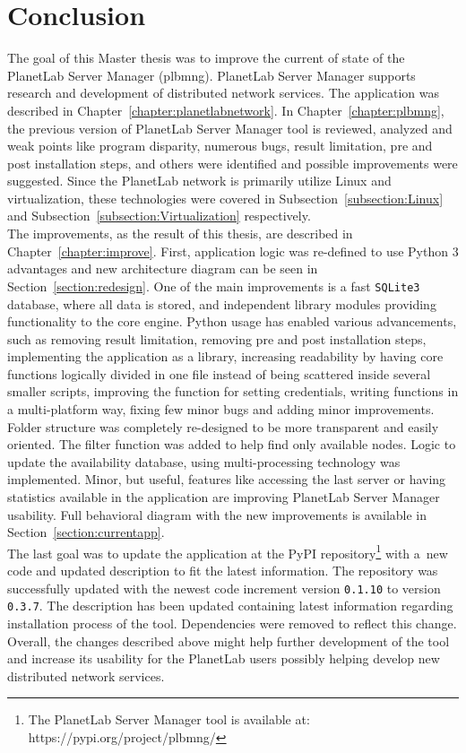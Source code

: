 \chapter{Conclusion}
The goal of this Master thesis was to improve the current of state of the PlanetLab Server Manager (plbmng). PlanetLab Server Manager supports research and development of distributed network services. The application was described in Chapter~\ref{chapter:planetlabnetwork}. In Chapter~\ref{chapter:plbmng}, the previous version of PlanetLab Server Manager tool is reviewed, analyzed and weak points like program disparity, numerous bugs, result limitation, pre and post installation steps, and others were identified and possible improvements were suggested. Since the PlanetLab network is primarily utilize Linux and virtualization, these technologies were covered in Subsection~\ref{subsection:Linux} and Subsection~\ref{subsection:Virtualization} respectively.\\
The improvements, as the result of this thesis, are described in Chapter~\ref{chapter:improve}. First, application logic was re-defined to use Python 3 advantages and new architecture diagram can be seen in Section~\ref{section:redesign}. One of the main improvements is a fast \texttt{SQLite3} database, where all data is stored, and independent library modules providing functionality to the core engine. Python usage has enabled various advancements, such as removing result limitation, removing pre and post installation steps, implementing the application as a library, increasing readability by having core functions logically divided in one file instead of being scattered inside several smaller scripts, improving the function for setting credentials, writing functions in a multi-platform way, fixing few minor bugs and adding minor improvements. Folder structure was completely re-designed to be more transparent and easily oriented. The filter function was added to help find only available nodes. Logic to update the availability database, using multi-processing technology was implemented. Minor, but useful, features like accessing the last server or having statistics available in the application are improving PlanetLab Server Manager usability. Full behavioral diagram with the new improvements is available in Section~\ref{section:currentapp}.\\
The last goal was to update the application at the PyPI repository\footnote{The PlanetLab Server Manager tool is available at: https://pypi.org/project/plbmng/} with a~new code and updated description to fit the latest information. The repository was successfully updated with the newest code increment version \texttt{0.1.10} to version \texttt{0.3.7}. The description has been updated containing latest information regarding installation process of the tool. Dependencies were removed to reflect this change. Overall, the changes described above might help further development of the tool and increase its usability for the PlanetLab users possibly helping develop new distributed network services.